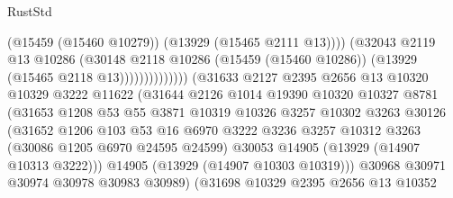 \begin{lexlean}{RustStd}
\begin{coremodule}
                                              (@15459 (@15460 @10279))
                                              (@13929 (@15465 @2111 @13))))
                                          (@32043
                                            @2119
                                            @13
                                            @10286
                                            (@30148
                                              @2118
                                              @10286
                                              (@15459 (@15460 @10286))
                                              (@13929 (@15465 @2118 @13))))))))))))))
                      (@31633
                        @2127
                        @2395
                        @2656
                        @13
                        @10320
                        @10329
                        @3222
                        @11622
                        (@31644
                          @2126
                          @1014
                          @19390
                          @10320
                          @10327
                          @8781
                          (@31653
                            @1208
                            @53
                            @55
                            @3871
                            @10319
                            @10326
                            @3257
                            @10302
                            @3263
                            @30126
                            (@31652
                              @1206
                              @103
                              @53
                              @16
                              @6970
                              @3222
                              @3236
                              @3257
                              @10312
                              @3263
                              (@30086 @1205 @6970 @24595 @24599)
                              @30053
                              @14905
                              (@13929 (@14907 @10313 @3222)))
                            @14905
                            (@13929 (@14907 @10303 @10319)))
                          @30968
                          @30971
                          @30974
                          @30978
                          @30983
                          @30989)
                        (@31698
                          @10329
                          @2395
                          @2656
                          @13
                          @10352

\end{coremodule}
\end{lexlean}
